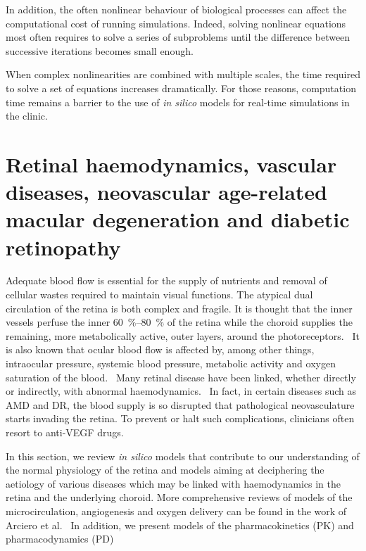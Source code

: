\documentclass{article}
\begin{document}
In addition, the often nonlinear behaviour of biological processes can affect the computational cost of running simulations.
Indeed, solving nonlinear equations most often requires to solve a series of subproblems until the difference between successive iterations becomes small enough.

When complex nonlinearities are combined with multiple scales, the time required to solve a set of equations increases dramatically.
For those reasons, computation time remains a barrier to the use of \textit{in silico} models for real-time simulations in the clinic.






\section*{Retinal haemodynamics, vascular diseases, neovascular age-related macular degeneration and diabetic retinopathy}

Adequate blood flow is essential for the supply of nutrients and removal of cellular wastes required to maintain visual functions.
The atypical dual circulation of the retina is both complex and fragile.
It is thought that the inner vessels perfuse the inner \SIrange{60}{80}{\percent} of the retina while the choroid supplies the remaining, more metabolically active, outer layers, around the photoreceptors.~\cite{Birol_2007}
It is also known that ocular blood flow is affected by, among other things, intraocular pressure, systemic blood pressure, metabolic activity and oxygen saturation of the blood.~\cite{Birol_2007,McCullough_1997,Palkovits_2014,Polska_2007,Pournaras_2008,Riva_1997,Wang_2014}
Many retinal disease have been linked, whether directly or indirectly, with abnormal haemodynamics.~\cite{Hayreh_2004,Medina_2016}
In fact, in certain diseases such as AMD and DR, the blood supply is so disrupted that pathological neovasculature starts invading the retina.
To prevent or halt such complications, clinicians often resort to anti-VEGF drugs.

In this section, we review \textit{in silico} models that contribute to our understanding of the normal physiology of the retina and models aiming at deciphering the aetiology of various diseases which may be linked with haemodynamics in the retina and the underlying choroid.
More comprehensive reviews of models of the microcirculation, angiogenesis and oxygen delivery can be found in the work of Arciero et al.~\cite{Arciero_2017, Arciero_2019}
In addition, we present models of the pharmacokinetics (PK) and pharmacodynamics (PD)
\end{document}
